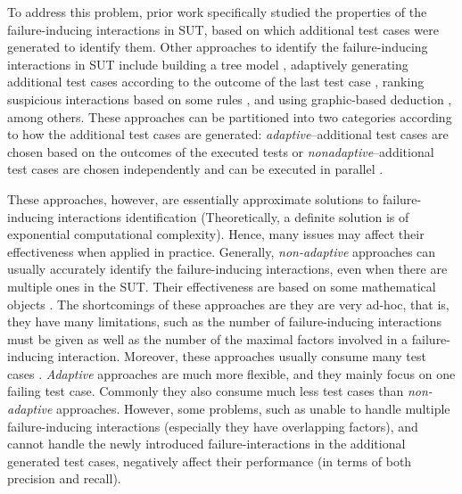 \documentclass{sig-alternate-05-2015}
\begin{document}
To address this problem, prior work \cite{nie2011minimal} specifically studied the properties of the failure-inducing interactions in SUT, based on which additional test cases were generated to identify them. Other approaches to identify the failure-inducing interactions in SUT include building a tree model \cite{yilmaz2006covering}, adaptively generating additional test cases according to the outcome of the last test case \cite{zhang2011characterizing}, ranking suspicious interactions based on some rules \cite{ghandehari2012identifying}, and using graphic-based deduction \cite{martinez2008algorithms}, among others. These approaches can be partitioned into two categories \cite{colbourn2008locating} according to how the additional test cases are generated: \emph{adaptive}--additional test cases are chosen based on the outcomes of the executed tests \cite{shi2005software,nie2011minimal,ghandehari2012identifying,niu2013identifying,zhang2011characterizing,shakya2012isolating,wang2010adaptive,li2012improved}or \emph{nonadaptive}--additional test cases are chosen independently and can be executed in parallel \cite{yilmaz2006covering,colbourn2008locating,martinez2008algorithms,martinez2009locating,zhang2012faulty}.

These approaches, however, are essentially approximate solutions to failure-inducing interactions identification (Theoretically, a definite solution is of exponential computational complexity). Hence, many issues may affect their effectiveness when applied in practice.  Generally, \emph{non-adaptive} approaches can usually accurately identify the failure-inducing interactions, even when there are multiple ones in the SUT. Their effectiveness are based on some mathematical objects \cite{colbourn2008locating,martinez2008algorithms,martinez2009locating}. The shortcomings of these approaches are they are very ad-hoc, that is, they have many limitations, such as the number of failure-inducing interactions must be given as well as the number of the maximal factors involved in a failure-inducing interaction. Moreover, these approaches usually consume many test cases \cite{zhang2011characterizing}. \emph{Adaptive} approaches are much more flexible, and they mainly focus on one failing test case. Commonly they also consume much less test cases than \emph{non-adaptive} approaches. However, some problems, such as unable to handle multiple failure-inducing interactions (especially they have overlapping factors), and cannot handle the newly introduced failure-interactions in the additional generated test cases, negatively affect their performance (in terms of both precision and recall).
\end{document}
